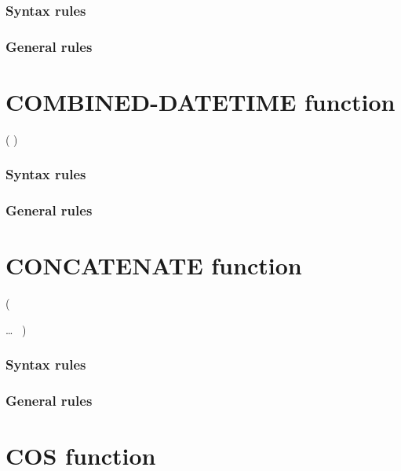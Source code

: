 \subsubsection{Syntax rules}

\subsubsection{General rules}

\section{COMBINED-DATETIME function}

\begin{syntax}
    ( \argument \argument )
\end{syntax}

\subsubsection{Syntax rules}

\subsubsection{General rules}

\section{CONCATENATE function}

\begin{syntax}
    (
  \begin{1=}
    \argument
  \end{1=}
  \ldots
  \ {})
\end{syntax}

\subsubsection{Syntax rules}

\subsubsection{General rules}

\section{COS function}

